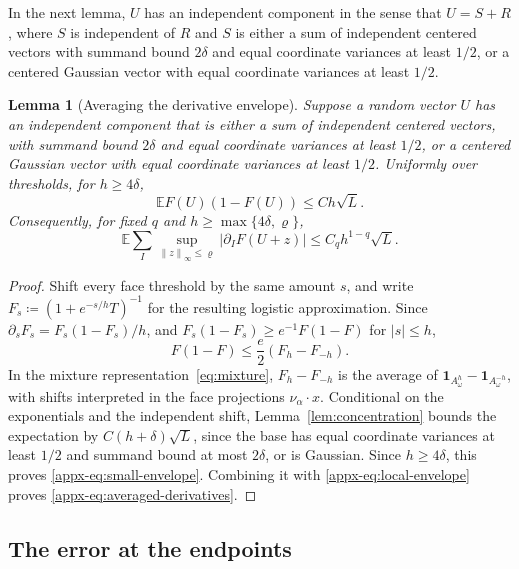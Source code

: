 \documentclass[11pt,letterpaper]{article}
\newtheorem{lemma}{Lemma}
\theoremstyle{remark}
\newcommand{\E}{\mathbb E}
\newcommand{\norm}[1]{\left\lVert#1\right\rVert}
\newcommand{\ind}{\mathbf 1}
\begin{document}
In the next lemma, \(U\) has an independent component in the sense
that \(U=S+R\), where \(S\) is independent of \(R\) and \(S\) is either a
sum of independent centered vectors with summand bound \(2\delta\) and
equal coordinate variances at least \(1/2\), or a centered Gaussian vector
with equal coordinate variances at least \(1/2\).

\begin{lemma}[Averaging the derivative envelope]\label{appx-lem:envelope}
Suppose a random vector \(U\) has an independent component that is
either a sum of independent centered vectors, with summand bound
\(2\delta\) and equal coordinate variances at least \(1/2\), or a
centered Gaussian vector with equal coordinate variances at least
\(1/2\).
Uniformly over thresholds, for \(h\ge4\delta\),
\begin{equation}
 \E F(U)(1-F(U))\le Ch\sqrt L.
 \label{appx-eq:small-envelope}
\end{equation}
Consequently, for fixed \(q\) and \(h\ge\max\{4\delta,\varrho\}\),
\begin{equation}
 \E\sum_I\sup_{\norm z_\infty\le\varrho}|\partial_IF(U+z)|
 \le C_q h^{1-q}\sqrt L.
 \label{appx-eq:averaged-derivatives}
\end{equation}
\end{lemma}

\begin{proof}
Shift every face threshold by the same amount \(s\), and write
\(F_s\coloneqq (1+e^{-s/h}T)^{-1}\) for the resulting logistic approximation. Since
\(\partial_sF_s=F_s(1-F_s)/h\), and
\(F_s(1-F_s)\ge e^{-1}F(1-F)\) for \(|s|\le h\),
\[
 F(1-F)\le\frac e2(F_h-F_{-h}).
\]
In the mixture representation~\eqref{eq:mixture},
\(F_h-F_{-h}\) is the average of
\(\ind_{A_{\omega}^h}-\ind_{A_{\omega}^{-h}}\), with shifts interpreted in the
face projections \(\nu_\alpha\cdot x\). Conditional on the exponentials and the
independent shift, Lemma~\ref{lem:concentration} bounds the expectation
by \(C(h+\delta)\sqrt L\), since the base has equal coordinate
variances
at least \(1/2\) and summand bound at most \(2\delta\), or is
Gaussian. Since \(h\ge4\delta\), this proves
\eqref{appx-eq:small-envelope}. Combining it with
\eqref{appx-eq:local-envelope} proves \eqref{appx-eq:averaged-derivatives}.
\end{proof}

\subsection{The error at the endpoints}
\end{document}
